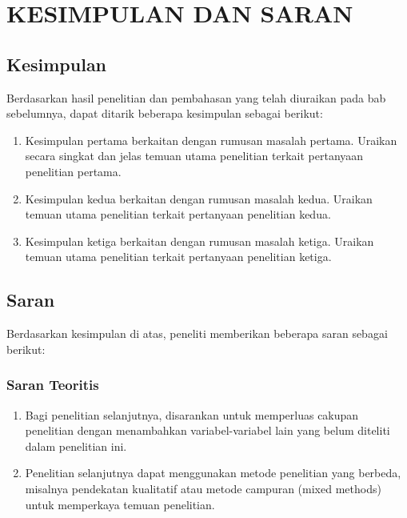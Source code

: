 
\chapter{KESIMPULAN DAN SARAN}
\label{bab:kesimpulan}

\section{Kesimpulan}
\label{sec:kesimpulan}

Berdasarkan hasil penelitian dan pembahasan yang telah diuraikan pada bab sebelumnya,
dapat ditarik beberapa kesimpulan sebagai berikut:

\begin{enumerate}
  \item Kesimpulan pertama berkaitan dengan rumusan masalah pertama. Uraikan secara
        singkat dan jelas temuan utama penelitian terkait pertanyaan penelitian pertama.

  \item Kesimpulan kedua berkaitan dengan rumusan masalah kedua. Uraikan temuan utama
        penelitian terkait pertanyaan penelitian kedua.

  \item Kesimpulan ketiga berkaitan dengan rumusan masalah ketiga. Uraikan temuan utama
        penelitian terkait pertanyaan penelitian ketiga.
\end{enumerate}

\section{Saran}
\label{sec:saran}

Berdasarkan kesimpulan di atas, peneliti memberikan beberapa saran sebagai berikut:

\subsection{Saran Teoritis}
\label{subsec:saran-teoritis}

\begin{enumerate}
  \item Bagi penelitian selanjutnya, disarankan untuk memperluas cakupan penelitian
        dengan menambahkan variabel-variabel lain yang belum diteliti dalam penelitian ini.

  \item Penelitian selanjutnya dapat menggunakan metode penelitian yang berbeda, misalnya
        pendekatan kualitatif atau metode campuran (mixed methods) untuk memperkaya
        temuan penelitian.
\end{enumerate}


